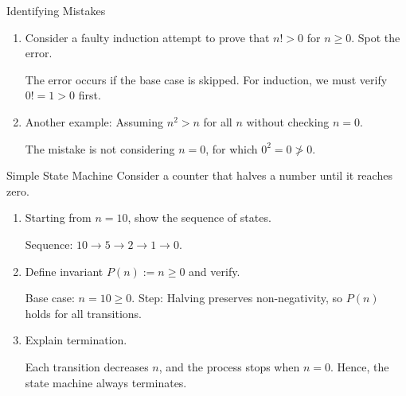 \documentclass{homework}
\begin{document}
\question Identifying Mistakes
\begin{enumerate}[label=\alph*)]
	\item Consider a faulty induction attempt to prove that $n! > 0$ for $n \geq 0$. Spot the error.
	      \begin{sol}
		      The error occurs if the base case is skipped. For induction, we must verify $0! = 1 > 0$ first.
	      \end{sol}

	\item Another example: Assuming $n^2 > n$ for all $n$ without checking $n=0$.
	      \begin{sol}
		      The mistake is not considering $n=0$, for which $0^2 = 0 \not> 0$.
	      \end{sol}
\end{enumerate}

\question Simple State Machine
Consider a counter that halves a number until it reaches zero.

\begin{enumerate}[label=\alph*)]
	\item Starting from $n=10$, show the sequence of states.
	      \begin{sol}
		      Sequence: $10 \to 5 \to 2 \to 1 \to 0$.
	      \end{sol}

	\item Define invariant $P(n) := n \geq 0$ and verify.
	      \begin{sol}
		      Base case: $n=10 \geq 0$.
		      Step: Halving preserves non-negativity, so $P(n)$ holds for all transitions.
	      \end{sol}

	\item Explain termination.
	      \begin{sol}
		      Each transition decreases $n$, and the process stops when $n=0$. Hence, the state machine always terminates.
	      \end{sol}
\end{enumerate}
\end{document}
